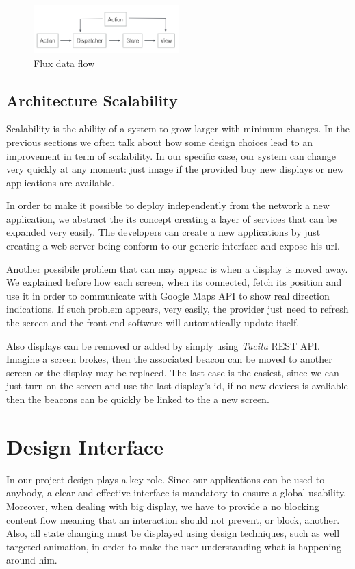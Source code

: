 \documentclass[]{usiinfbachelorproject}
\begin{document}
\begin{figure}[H]
  \centering
  \includegraphics[width=0.5\textwidth]{./images/flux_data_flow.png}
  \caption{Flux data flow}
\end{figure} 
\subsection{Architecture Scalability}
Scalability is the ability of a system to grow larger with minimum changes. In the previous sections we often talk about how some design choices lead to an improvement in term of scalability. In our specific case, our system can change very quickly at any moment: just image if the provided buy new displays or new applications are available.

In order to make it possible to deploy independently from the network a new application, we abstract the its concept creating a layer of services that can be expanded very easily. The developers can create a new applications by just creating a web server being conform to our generic interface and expose his url.

Another possibile problem that can may appear is when a display is moved away. We explained before how each screen, when its connected, fetch its position and use it in order to communicate with Google Maps API to show real direction indications. If such problem appears, very easily, the provider just need to refresh the screen and the front-end software will automatically update itself.

Also displays can be removed or added by simply using \emph{Tacita} REST API. Imagine a screen brokes, then the associated beacon can be moved to another screen or the display may be replaced. The last case is the easiest, since we can just turn on the screen and use the last display's id, if no new devices is avaliable then the beacons can be quickly be linked to the a new screen.

\section{Design Interface}
In our project design plays a key role. Since our applications can be used to anybody, a clear and effective interface is mandatory to ensure a global usability. Moreover, when dealing with big display, we have to provide a no blocking content flow meaning that an interaction should not prevent, or block, another. Also, all state changing must be displayed using design techniques, such as well targeted animation, in order to make the user understanding what is happening around him.
\end{document}
